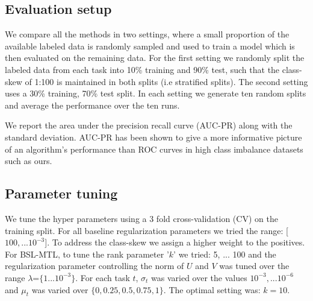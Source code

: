 \documentclass[runningheads,a4paper]{llncs}
\begin{document}
\subsection{Evaluation setup}
We compare all the methods in two settings, where a small proportion of the available labeled data is randomly sampled and used to train a model which is then evaluated on the remaining data. For the first setting we randomly split the labeled data from each task into 10\% training and 90\% test, such that the class-skew of 1:100 is maintained in both splits (i.e stratified splits). The second setting uses a 30\% training, 70\% test split. 
In each setting we generate ten random splits and average the performance over the ten runs.

We report the area under the precision recall curve (AUC-PR) along with the standard deviation. 
AUC-PR has been shown to give a more informative picture of an algorithm's performance than ROC curves in high class imbalance datasets \citep{davis2006} such as ours. 



\subsection{Parameter tuning}
We tune the hyper parameters using a 3 fold cross-validation (CV) on the training split. For all baseline regularization parameters %
we tried the range: [$100, ...10^{-3}$]. To address the class-skew we 
assign a higher weight to the positives. For BSL-MTL, to tune the rank parameter '$k$' we tried: 5, ... 100 and the regularization parameter controlling the norm of $U$ and $V$ was tuned over the range $\lambda$=$\{1 ... 10^{-3}\}$. For each task $t$, $\sigma_t$ was varied over the values $10^{-3}, ... 10^{-6}$ and
$\mu_t$ was varied over $\{0, 0.25, 0.5, 0.75, 1\}$.
The optimal setting was:  $k=10$. %

\end{document}
